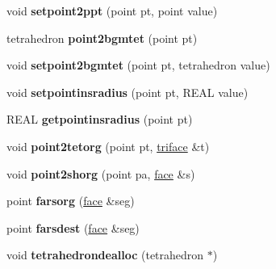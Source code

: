 \begin{DoxyCompactItemize}
\item 
\hypertarget{classtetgenmesh_a1a212c15e5f467b3baf68cd79217ed99}{void {\bfseries setpoint2ppt} (point pt, point value)}\label{classtetgenmesh_a1a212c15e5f467b3baf68cd79217ed99}

\item 
\hypertarget{classtetgenmesh_a3cb62ec0ca76c3f770e82620151b2398}{tetrahedron {\bfseries point2bgmtet} (point pt)}\label{classtetgenmesh_a3cb62ec0ca76c3f770e82620151b2398}

\item 
\hypertarget{classtetgenmesh_a28fee8bde806c0943c547c942d345720}{void {\bfseries setpoint2bgmtet} (point pt, tetrahedron value)}\label{classtetgenmesh_a28fee8bde806c0943c547c942d345720}

\item 
\hypertarget{classtetgenmesh_ab6c839cb3352d18112a13f76f41ce967}{void {\bfseries setpointinsradius} (point pt, R\-E\-A\-L value)}\label{classtetgenmesh_ab6c839cb3352d18112a13f76f41ce967}

\item 
\hypertarget{classtetgenmesh_afa0b4bc0644cf85486f22aeea86411d7}{R\-E\-A\-L {\bfseries getpointinsradius} (point pt)}\label{classtetgenmesh_afa0b4bc0644cf85486f22aeea86411d7}

\item 
\hypertarget{classtetgenmesh_a08a487daca1979751e3d4e536182cbc3}{void {\bfseries point2tetorg} (point pt, \hyperlink{classtetgenmesh_1_1triface}{triface} \&t)}\label{classtetgenmesh_a08a487daca1979751e3d4e536182cbc3}

\item 
\hypertarget{classtetgenmesh_a954a60725f3469a3fef1dd728b771de3}{void {\bfseries point2shorg} (point pa, \hyperlink{classtetgenmesh_1_1face}{face} \&s)}\label{classtetgenmesh_a954a60725f3469a3fef1dd728b771de3}

\item 
\hypertarget{classtetgenmesh_a4cfceaae09b75d47e9f99fa1fc475d2a}{point {\bfseries farsorg} (\hyperlink{classtetgenmesh_1_1face}{face} \&seg)}\label{classtetgenmesh_a4cfceaae09b75d47e9f99fa1fc475d2a}

\item 
\hypertarget{classtetgenmesh_a08a4f8d3b4b894aa461e3b3574bdd606}{point {\bfseries farsdest} (\hyperlink{classtetgenmesh_1_1face}{face} \&seg)}\label{classtetgenmesh_a08a4f8d3b4b894aa461e3b3574bdd606}

\item 
\hypertarget{classtetgenmesh_a29b3b481a2306b71f81c975481a890e1}{void {\bfseries tetrahedrondealloc} (tetrahedron $\ast$)}\label{classtetgenmesh_a29b3b481a2306b71f81c975481a890e1}


\end{DoxyCompactItemize}
